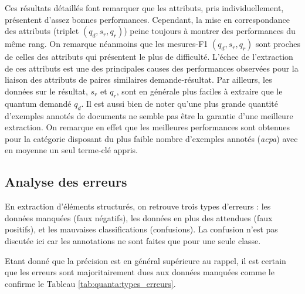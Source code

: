 Ces résultats détaillés font remarquer que les attributs, pris individuellement, présentent d'assez bonnes performances. Cependant, la mise en correspondance des attributs (triplet $(q_d,s_r, q_r)$) peine toujours à montrer des performances du même rang. On remarque néanmoins que les mesures-F1 $(q_d,s_r, q_r)$ sont proches de celles des attributs qui présentent le plus de difficulté. L'échec de l'extraction de ces attributs est une des principales causes des performances observées pour la liaison des attributs de paires similaires demande-résultat. Par ailleurs, les données sur le résultat, $s_r$ et $q_r$, sont en générale plus faciles à extraire que le quantum demandé $q_d$. Il est aussi bien de noter qu'une plus grande quantité d'exemples annotés de documents ne semble pas être la garantie d'une meilleure extraction. On remarque en effet que les meilleures performances sont obtenues pour la catégorie disposant du plus faible nombre d'exemples annotés (\textit{acpa}) avec en moyenne un seul terme-clé appris. %

\subsection{Analyse des erreurs}

En extraction d'éléments structurés, on retrouve trois types d'erreurs \citep{yang2016jointEntityEvt}: les données manquées (faux négatifs), les données en plus des attendues (faux positifs), et les mauvaises classifications (confusions). La confusion n'est pas discutée ici car les annotations ne sont faites que pour une seule classe. %

Etant donné que la précision est en général supérieure au rappel, il est certain que les erreurs sont majoritairement dues aux données manquées comme le confirme le Tableau \ref{tab:quanta:types_erreurs}. 

